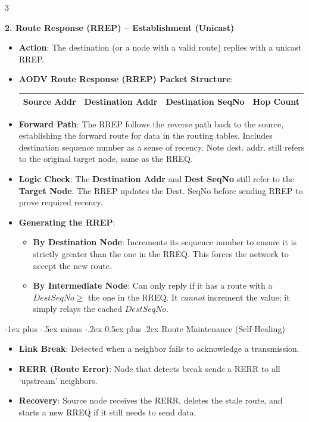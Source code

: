 \documentclass[a4paper, 9pt, landscape]{extarticle}
\makeatletter
\renewcommand{\subsubsection}{\@startsection{paragraph}{4}{0mm}%
                                {-1ex plus -.5ex minus -.2ex}%
                                {0.5ex plus .2ex}%
                                {\normalfont\footnotesize\bfseries}}
\makeatother
\begin{document}
\begin{multicols*}{3}
\smallskip

\textbf{2. Route Response (RREP) -- Establishment (Unicast)}
\begin{itemize}
  \item \textbf{Action}: The destination (or a node with a valid route) replies with a unicast RREP.
  \item \textbf{AODV Route Response (RREP) Packet Structure}:
  \begin{center}
      \begin{tabular}{|c|c|c|c|}
      \hline
      Source Addr & Destination Addr & Destination SeqNo & Hop Count \\
      \hline
      \end{tabular}
  \end{center}
  \item \textbf{Forward Path}: The RREP follows the reverse path back to the source, establishing the forward route for data in the routing tables. Includes destination sequence number as a sense of recency. Note dest. addr. still refers to the original target node, same as the RREQ.
  \item \textbf{Logic Check}: The \textbf{Destination Addr} and \textbf{Dest SeqNo} still refer to the \textbf{Target Node}. The RREP updates the Dest. SeqNo before sending RREP to prove required recency.
  \item \textbf{Generating the RREP}: 
    \begin{itemize}
      \item \textbf{By Destination Node}: Increments its sequence number to ensure it is strictly greater than the one in the RREQ. This forces the network to accept the new route.
      \item \textbf{By Intermediate Node}: Can only reply if it has a route with a $Dest SeqNo \geq$ the one in the RREQ. It \textit{cannot} increment the value; it simply relays the cached $DestSeqNo$.
    \end{itemize}
\end{itemize}
  

\subsubsection{Route Maintenance (Self-Healing)}
\begin{itemize}
  \item \textbf{Link Break}: Detected when a neighbor fails to acknowledge a transmission.
  \item \textbf{RERR (Route Error)}: Node that detects break sends a RERR to all `upstream' neighbors.
  \item \textbf{Recovery}: Source node receives the RERR, deletes the stale route, and starts a new RREQ if it still needs to send data.
\end{itemize}


\end{multicols*}
\end{document}
